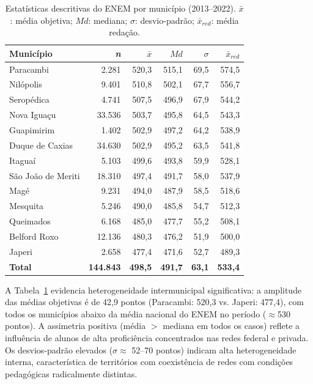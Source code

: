 \documentclass[12pt]{article}
\begin{document}
\begin{table}[ht]
\centering
\caption{Estatísticas descritivas do ENEM por município (2013--2022). $\bar{x}$: média
  objetiva; $Md$: mediana; $\sigma$: desvio-padrão; $\bar{x}_{red}$: média redação.}
\label{tab:enem}
\small
\begin{tabular}{lrrrrr}
\toprule
\textbf{Município} & \textbf{\textit{n}} & $\bar{x}$ & $Md$ & $\sigma$ & $\bar{x}_{red}$ \\
\midrule
Paracambi          &  2.281 & 520,3 & 515,1 & 69,5 & 574,5 \\
Nilópolis          &  9.401 & 510,8 & 502,1 & 67,7 & 556,7 \\
Seropédica         &  4.741 & 507,5 & 496,9 & 67,9 & 544,2 \\
Nova Iguaçu        & 33.536 & 503,7 & 495,8 & 64,5 & 543,3 \\
Guapimirim         &  1.402 & 502,9 & 497,2 & 64,2 & 538,9 \\
Duque de Caxias    & 34.630 & 502,9 & 495,2 & 63,5 & 541,8 \\
Itaguaí            &  5.103 & 499,6 & 493,8 & 59,9 & 528,1 \\
São João de Meriti & 18.310 & 497,4 & 491,7 & 58,0 & 537,9 \\
Magé               &  9.231 & 494,0 & 487,9 & 58,5 & 518,6 \\
Mesquita           &  5.246 & 490,0 & 485,8 & 54,7 & 512,3 \\
Queimados          &  6.168 & 485,0 & 477,7 & 55,2 & 508,1 \\
Belford Roxo       & 12.136 & 480,3 & 476,2 & 51,9 & 500,0 \\
Japeri             &  2.658 & 477,4 & 471,6 & 52,7 & 489,3 \\
\midrule
\textbf{Total} & \textbf{144.843} & \textbf{498,5} & \textbf{491,7} & \textbf{63,1} & \textbf{533,4} \\
\bottomrule
\end{tabular}
\end{table}

A Tabela~\ref{tab:enem} evidencia heterogeneidade intermunicipal significativa: a
amplitude das médias objetivas é de 42,9 pontos (Paracambi: 520,3 vs. Japeri: 477,4),
com todos os municípios abaixo da média nacional do ENEM no período ($\approx$530
pontos). A assimetria positiva (média $>$ mediana em todos os casos) reflete a influência
de alunos de alta proficiência concentrados nas redes federal e privada. Os
desvios-padrão elevados ($\sigma \approx$ 52--70 pontos) indicam alta heterogeneidade
interna, característica de territórios com coexistência de redes com condições
pedagógicas radicalmente distintas.
\end{document}
